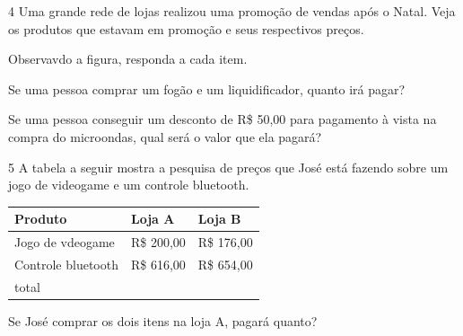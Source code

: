 \begin{multicols}{2}
\num{4} Uma grande rede de lojas realizou uma promoção de vendas após o Natal.
Veja os produtos que estavam em promoção e seus respectivos preços.






Observavdo a figura, responda a cada item.

\begin{escolha}
\item Se uma pessoa comprar um fogão e um liquidificador, quanto irá pagar?


\item Se uma pessoa conseguir um desconto de R\$ 50,00 para pagamento à
  vista na compra do microondas, qual será o valor que ela pagará?

\end{escolha}

\num{5} A tabela a seguir mostra a pesquisa de preços que José está fazendo
sobre um jogo de videogame e um controle bluetooth.

\begin{longtable}[]{@{}lll@{}}
\toprule
Produto & Loja A & Loja B\tabularnewline
\midrule
\endhead
Jogo de vdeogame & R\$ 200,00 & R\$ 176,00\tabularnewline
Controle bluetooth & R\$ 616,00 & R\$ 654,00\tabularnewline
total & &\tabularnewline
\bottomrule
\end{longtable}

\begin{escolha}
\item Se José comprar os dois itens na loja A, pagará quanto?


\end{escolha}
\end{multicols}
